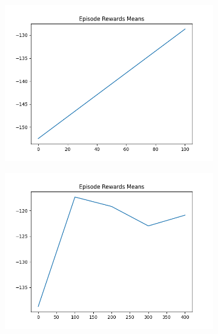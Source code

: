 \begin{figure}[H]
    \centering
    \begin{subfigure}{.47\linewidth}
        \centering
        \includegraphics[width=\textwidth]{mountain/2024-06-15_13-41-53_dqn_mountaincar_episode_rewards_means.png}
    \end{subfigure}
    \begin{subfigure}{.47\linewidth}
        \centering
        \includegraphics[width=\textwidth]{mountain/2024-06-15_13-02-52_dqn_mountaincar_episode_rewards_means.png}
    \end{subfigure}
    \begin{subfigure}{.47\linewidth}
        \centering

\end{subfigure}
\end{figure}
